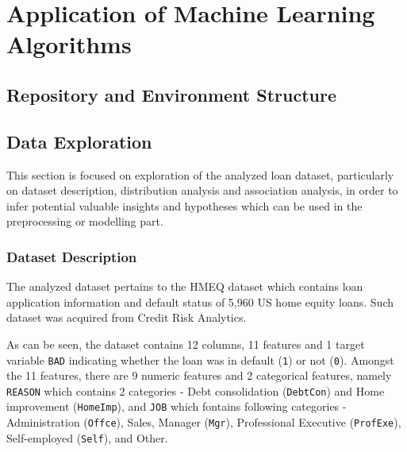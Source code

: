 \chapter{Application of Machine Learning Algorithms}
\label{chap:four}

\section{Repository and Environment Structure}
\section{Data Exploration}
This section is focused on exploration of the analyzed loan dataset, particularly on dataset description, distribution analysis and association analysis, in order to infer potential valuable insights and hypotheses which can be used in the preprocessing or modelling part.
\subsection{Dataset Description}
The analyzed dataset pertains to the HMEQ dataset which contains loan application information and default status of 5,960 US home equity loans. Such dataset was acquired from Credit Risk Analytics.

As can be seen, the dataset contains 12 columns, 11 features and 1 target variable \texttt{BAD} indicating whether the loan was in default (\texttt{1}) or not (\texttt{0}). Amongst the 11 features, there are 9 numeric features and 2 categorical features, namely \texttt{REASON} which contains 2 categories - Debt consolidation (\texttt{DebtCon}) and Home improvement (\texttt{HomeImp}), and \texttt{JOB} which fontains following categories - Administration (\texttt{Offce}), Sales, Manager (\texttt{Mgr}), Professional Executive (\texttt{ProfExe}), Self-employed (\texttt{Self}), and Other.


